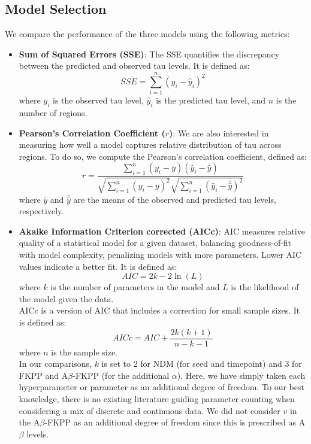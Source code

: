 \subsection{Model Selection}
We compare the performance of the three models using the following metrics:
\begin{itemize}
    \item \textbf{Sum of Squared Errors (SSE)}: 
    The SSE quantifies the discrepancy between the predicted and observed tau levels. It is defined as:
    $$SSE = \sum_{i=1}^{n} (y_i - \hat{y}_i)^2$$
    where $y_i$ is the observed tau level, $\hat{y}_i$ is the predicted tau level, and $n$ is the number of regions.
    
    \item \textbf{Pearson's Correlation Coefficient ($r$)}:
    We are also interested in measuring how well a model captures relative distribution of tau across regions. To do so, we compute the Pearson's correlation coefficient, defined as:
    $$r = \frac{\sum_{i=1}^{n} (y_i - \bar{y})(\hat{y}_i - \bar{\hat{y}})}{\sqrt{\sum_{i=1}^{n} (y_i - \bar{y})^2} \sqrt{\sum_{i=1}^{n} (\hat{y}_i - \bar{\hat{y}})^2}}$$
    where $\bar{y}$ and $\bar{\hat{y}}$ are the means of the observed and predicted tau levels, respectively.\\
    
    \item \textbf{Akaike Information Criterion corrected (AICc)}: 
    AIC measures relative quality of a statistical model for a given dataset, balancing goodness-of-fit with model complexity, penalizing models with more parameters. Lower AIC values indicate a better fit. It is defined as:
    $$AIC = 2k - 2\ln(L)$$
    where $k$ is the number of parameters in the model and $L$ is the likelihood of the model given the data.\\

    AICc is a version of AIC that includes a correction for small sample sizes. It is defined as:
    $$AICc = AIC + \frac{2k(k+1)}{n-k-1}$$
    where $n$ is the sample size. \\

    In our comparisons, $k$ is set to 2 for NDM (for seed and timepoint) and 3 for FKPP and A$\beta$-FKPP (for the additional $\alpha$). Here, we have simply taken each hyperparameter or parameter as an additional degree of freedom. To our best knowledge, there is no existing literature guiding parameter counting when considering a mix of discrete and continuous data. We did not consider $v$ in the A$\beta$-FKPP as an additional degree of freedom since this is prescribed as A$\beta$ levels.\\


\end{itemize}
